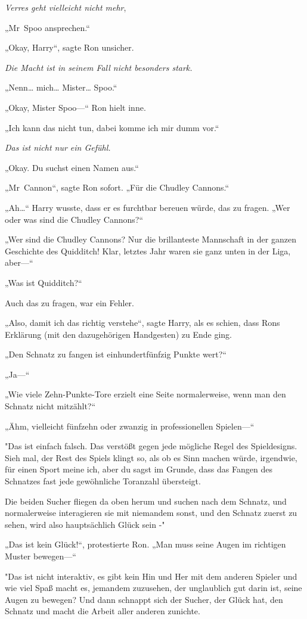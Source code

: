 {\emph{Verres geht vielleicht nicht mehr},

„Mr~Spoo ansprechen.“

„Okay, Harry“, sagte Ron unsicher.

\emph{Die Macht ist in seinem Fall nicht besonders stark.}

„Nenn… mich… Mister… Spoo.“

„Okay, Mister Spoo—“ Ron hielt inne.

„Ich kann das nicht tun, dabei komme ich mir dumm vor.“

\emph{Das ist nicht nur ein Gefühl.}

„Okay. Du suchst einen Namen aus.“

„Mr~Cannon“, sagte Ron sofort. „Für die Chudley Cannons.“

„Ah…“ Harry wusste, dass er es furchtbar bereuen würde, das zu fragen. „Wer oder was sind die Chudley Cannons?“

„Wer sind die Chudley Cannons? Nur die brillanteste Mannschaft in der ganzen Geschichte des Quidditch! Klar, letztes Jahr waren sie ganz unten in der Liga, aber—“

„Was ist Quidditch?“

Auch das zu fragen, war ein Fehler.

„Also, damit ich das richtig verstehe“, sagte Harry, als es schien, dass Rons Erklärung (mit den dazugehörigen Handgesten) zu Ende ging.

„Den Schnatz zu fangen ist einhundertfünfzig Punkte wert?“

„Ja—“

„Wie viele Zehn-Punkte-Tore erzielt eine Seite normalerweise, wenn man den Schnatz nicht mitzählt?“

„Ähm, vielleicht fünfzehn oder zwanzig in professionellen Spielen—“

"Das ist einfach falsch. Das verstößt gegen jede mögliche Regel des Spieldesigns. Sieh mal, der Rest des Spiels klingt so, als ob es Sinn machen würde, irgendwie, für einen Sport meine ich, aber du sagst im Grunde, dass das Fangen des Schnatzes fast jede gewöhnliche Toranzahl übersteigt.

Die beiden Sucher fliegen da oben herum und suchen nach dem Schnatz, und normalerweise interagieren sie mit niemandem sonst, und den Schnatz zuerst zu sehen, wird also hauptsächlich Glück sein -"

„Das ist kein Glück!“, protestierte Ron. „Man muss seine Augen im richtigen Muster bewegen—“

"Das ist nicht interaktiv, es gibt kein Hin und Her mit dem anderen Spieler und wie viel Spaß macht es, jemandem zuzusehen, der unglaublich gut darin ist, seine Augen zu bewegen? Und dann schnappt sich der Sucher, der Glück hat, den Schnatz und macht die Arbeit aller anderen zunichte.

}
